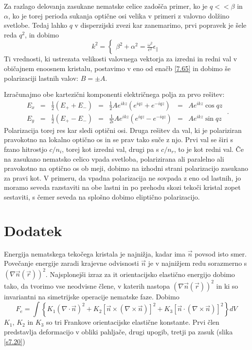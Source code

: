Za razlago delovanja zasukane nematske celice zadošča primer, ko je
$q<<\beta$ in $\alpha$, ko je torej perioda sukanja optične osi
velika v primeri z valovno dolžino svetlobe. Tedaj lahko $q$ v disperzijski
zvezi kar zanemarimo, prvi popravek je šele reda $q^{2}$, in dobimo
\begin{equation}
k^{2}=\left\{ \begin{matrix}\beta^{2}+\alpha^{2}=\frac{\omega^{2}}{c^{2}}\epsilon_{\parallel}\end{matrix}\right.\label{7.67}
\end{equation}
 Ti vrednosti, ki ustrezata velikosti valovnega vektorja za izredni
in redni val v običajnem enoosnem kristalu, postavimo v eno od enačb
\ref{7.65} in dobimo še polarizaciji lastnih valov: $B=\pm A$.

Izračunajmo obe kartezični komponenti električnega polja za prvo rešitev:
\begin{equation}
\begin{array}{lclclcl}
E_{x} & = & \frac{1}{2}(E_{+}+E_{-}) & = & \frac{1}{2}Ae^{ikz}(e^{iqz}+e^{-iqz}) & = & Ae^{ikz}\cos qz\\
E_{y} & = & \frac{1}{2}(E_{+}-E_{-}) & = & \frac{1}{2i}Ae^{ikz}(e^{iqz}-e^{-iqz}) & = & Ae^{ikz}\sin qz
\end{array}\;.\label{7.68}
\end{equation}
 Polarizacija torej res kar sledi optični osi. Druga rešitev da val,
ki je polariziran pravokotno na lokalno optično os in se prav tako
suče z njo. Prvi val se širi s fzano hitrostjo $c/n_{i}$, torej kot
izredni val, drugi pa s $c/n_{r}$, to je kot redni val. Če na zasukano
nematsko celico vpada svetloba, polarizirana ali paralelno ali pravokotno
na optično os ob meji, dobimo na izhodni strani polarizacijo zasukano
za pravi kot. V primeru, da vpadna polarizacija ne sovpada z eno od
lastnih, jo moramo seveda razstaviti na obe lastni in po prehodu skozi
tekoči kristal zopet sestaviti, s čemer seveda na splošno dobimo eliptično
polarizacijo.


\section{Dodatek}

Energija nematskega tekočega kristala je najnižja, kadar ima $\vec{n}$
povsod isto smer. Povečanje energije zaradi krajevne odvisnosti $\vec{n}$
je v najnižjem redu sorazmerno s $(\nabla\vec{n}(\vec{r}))^{2}$.
Najsplo\textquotedbl{}nejši izraz za {it orientacijsko elastično
energijo} dobimo tako, da tvorimo vse neodvisne člene, v katerih
nastopa $(\nabla\vec{n}(\vec{r}))^{2}$ in ki so invariantni na simetrijske
operacije nematske faze. Dobimo\cite{degennes} 
\begin{equation}
F_{e}=\int\left\{ K_{1}(\nabla\cdot\vec{n})^{2}+K_{2}[\vec{n}\times(\nabla\times\vec{n})]^{2}+K_{3}[\vec{n}\cdot(\nabla\times\vec{n})]^{2}\right\} dV\label{7.70}
\end{equation}
 $K_{1}$, $K_{2}$ in $K_{3}$ so tri Frankove orientacijske elastične
konstante. Prvi člen predstavlja deformacijo v obliki pahljače, drugi
upogib, tretji pa zasuk (slika \ref{s7.20})

